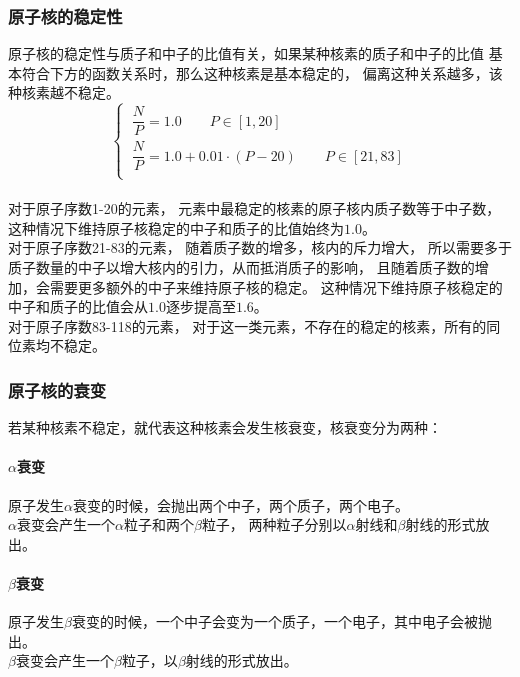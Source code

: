 \documentclass[UTF8]{ctexart}
\begin{document}
\subsubsection{原子核的稳定性}
    原子核的稳定性与质子和中子的比值有关，如果某种核素的质子和中子的比值
    基本符合下方的函数关系时，那么这种核素是基本稳定的，
    偏离这种关系越多，该种核素越不稳定。\\
    \begin{equation*}
        \begin{cases}
            \ \dfrac{N}{P}=1.0\qquad P\in[1,20]\\[6mm]
            \ \dfrac{N}{P}=1.0+0.01\cdot(P-20)\qquad P\in[21,83]\\
        \end{cases}
    \end{equation*}\\
    对于原子序数1-20的元素，
    元素中最稳定的核素的原子核内质子数等于中子数，
    这种情况下维持原子核稳定的中子和质子的比值始终为$1.0$。\\[3mm]
    对于原子序数21-83的元素，
    随着质子数的增多，核内的斥力增大，
    所以需要多于质子数量的中子以增大核内的引力，从而抵消质子的影响，
    且随着质子数的增加，会需要更多额外的中子来维持原子核的稳定。
    这种情况下维持原子核稳定的中子和质子的比值会从$1.0$逐步提高至$1.6$。\\[3mm]
    对于原子序数83-118的元素，
    对于这一类元素，不存在的稳定的核素，所有的同位素均不稳定。

\newpage

\subsubsection{原子核的衰变}
    若某种核素不稳定，就代表这种核素会发生核衰变，核衰变分为两种：

\paragraph{$\alpha$衰变}
    原子发生$\alpha$衰变的时候，会抛出两个中子，两个质子，两个电子。\\[1mm]
    $\alpha$衰变会产生一个$\alpha$粒子和两个$\beta$粒子，
    两种粒子分别以$\alpha$射线和$\beta$射线的形式放出。

\paragraph{$\beta$衰变}
    原子发生$\beta$衰变的时候，一个中子会变为一个质子，一个电子，其中电子会被抛出。\\[1mm]
    $\beta$衰变会产生一个$\beta$粒子，以$\beta$射线的形式放出。\\
\end{document}
